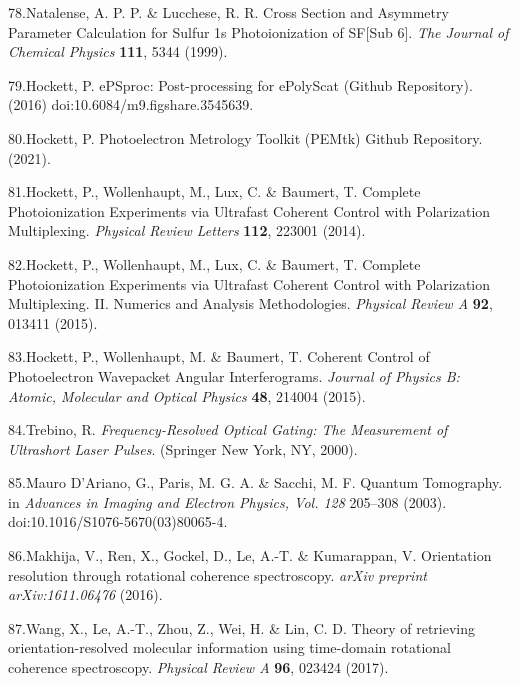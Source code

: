\documentclass[10pt]{article}
\begin{document}
\label{csl:78}78.Natalense, A. P. P. \& Lucchese, R. R. {Cross Section and Asymmetry Parameter Calculation for Sulfur 1s Photoionization of {{SF}}[Sub 6]}. \textit{The Journal of Chemical Physics} \textbf{111}, 5344 (1999).

\label{csl:79}79.Hockett, P. {{{ePSproc}}: {{Post-processing}} for {{ePolyScat}} ({{Github}} Repository)}. (2016) doi:10.6084/m9.figshare.3545639.

\label{csl:80}80.Hockett, P. {Photoelectron {{Metrology Toolkit}} ({{PEMtk}}) {{Github}} Repository}. (2021).

\label{csl:81}81.Hockett, P., Wollenhaupt, M., Lux, C. \& Baumert, T. {Complete {{Photoionization Experiments}} via {{Ultrafast Coherent Control}} with {{Polarization Multiplexing}}}. \textit{Physical Review Letters} \textbf{112}, 223001 (2014).

\label{csl:82}82.Hockett, P., Wollenhaupt, M., Lux, C. \& Baumert, T. {Complete Photoionization Experiments via Ultrafast Coherent Control with Polarization Multiplexing. {{II}}. {{Numerics}} and Analysis Methodologies}. \textit{Physical Review A} \textbf{92}, 013411 (2015).

\label{csl:83}83.Hockett, P., Wollenhaupt, M. \& Baumert, T. {Coherent Control of Photoelectron Wavepacket Angular Interferograms}. \textit{Journal of Physics B: Atomic, Molecular and Optical Physics} \textbf{48}, 214004 (2015).

\label{csl:84}84.Trebino, R. \textit{{Frequency-{{Resolved Optical Gating}}: {{The Measurement}} of {{Ultrashort Laser Pulses}}}}. ({Springer New York, NY}, 2000).

\label{csl:85}85.Mauro D'Ariano, G., Paris, M. G. A. \& Sacchi, M. F. {Quantum {{Tomography}}}. in \textit{Advances in {{Imaging}} and {{Electron Physics}}, {{Vol}}. 128} 205–308 (2003). doi:10.1016/S1076-5670(03)80065-4.

\label{csl:86}86.Makhija, V., Ren, X., Gockel, D., Le, A.-T. \& Kumarappan, V. {Orientation resolution through rotational coherence spectroscopy}. \textit{arXiv preprint arXiv:1611.06476} (2016).

\label{csl:87}87.Wang, X., Le, A.-T., Zhou, Z., Wei, H. \& Lin, C. D. {Theory of retrieving orientation-resolved molecular information using time-domain rotational coherence spectroscopy}. \textit{Physical Review A} \textbf{96}, 023424 (2017).
\end{document}
